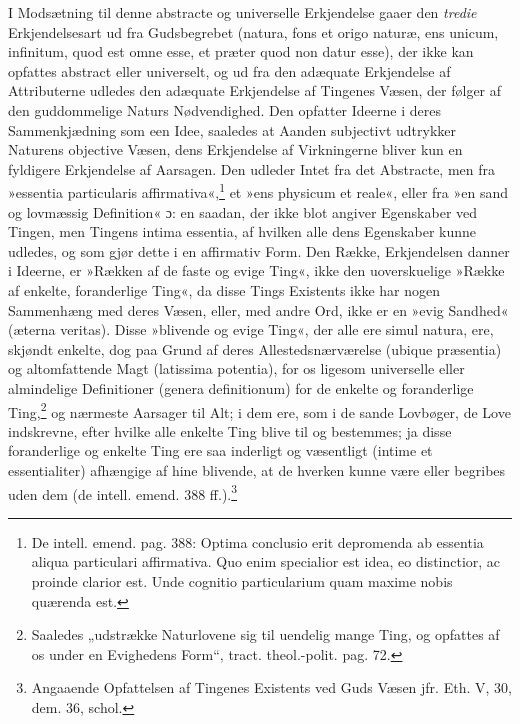 \documentclass[12pt,a4paper]{book}
\newcommand{\opage}[1]{\marginnote{\footnotesize\textit{[#1]}}}
\begin{document}
I Modsætning til denne abstracte og universelle Erkjendelse gaaer
den \emph{tredie} Erkjendelsesart ud fra Gudsbegrebet (natura, fons
et origo naturæ, ens unicum, infinitum, quod est omne esse, et
præter quod non datur esse), der ikke kan opfattes abstract eller
universelt, og ud fra den adæquate
\opage{102} \setcounter{footnote}{0}%
Erkjendelse af Attributerne udledes den adæquate Erkjendelse af
Tingenes Væsen, der følger af den guddommelige Naturs Nødvendighed.
Den opfatter Ideerne i deres Sammenkjædning som een Idee, saaledes
at Aanden subjectivt udtrykker Naturens objective Væsen, dens
Erkjendelse af Virkningerne bliver kun en fyldigere Erkjendelse af
Aarsagen. Den udleder Intet fra det Abstracte, men fra »essentia
particularis affirmativa«,\footnote{De intell. emend. pag. 388:
Optima conclusio erit depromenda ab essentia aliqua particulari
affirmativa. Quo enim specialior est idea, eo distinctior, ac
proinde clarior est. Unde cognitio particularium quam maxime nobis
quærenda est.} et »ens physicum et reale«, eller fra »en sand og
lovmæssig Definition« ɔ: en saadan, der ikke blot angiver Egenskaber
ved Tingen, men Tingens intima essentia, af hvilken alle dens
Egenskaber kunne udledes, og som gjør dette i en affirmativ Form.
Den Række, Erkjendelsen danner i Ideerne, er »Rækken af de faste og
evige Ting«, ikke den uoverskuelige »Række af enkelte, foranderlige
Ting«, da disse Tings Existents ikke har nogen Sammenhæng med deres
Væsen, eller, med andre Ord, ikke er en »evig Sandhed« (æterna
veritas). Disse »blivende og evige Ting«, der alle ere simul natura,
ere, skjøndt enkelte, dog paa Grund af deres Allestedsnærværelse
(ubique præsentia) og altomfattende Magt (latissima potentia), for
os ligesom universelle eller almindelige Definitioner (genera
definitionum) for de enkelte og foranderlige
Ting,\footnote{Saaledes „udstrække Naturlovene sig til uendelig
mange Ting, og opfattes af os under en Evighedens Form“, tract.
theol.-polit. pag. 72.} og nærmeste Aarsager til Alt; i dem ere, som
i de sande Lovbøger, de Love indskrevne, efter hvilke alle enkelte
Ting blive til og bestemmes; ja disse foranderlige og enkelte Ting
ere saa inderligt og væsentligt (intime et essentialiter) afhængige
af hine blivende, at de hverken kunne være eller begribes uden dem
(de intell. emend. 388 ff.).\footnote{Angaaende Opfattelsen af
Tingenes Existents ved Guds Væsen jfr. Eth. V, 30, dem. 36, schol.}
\end{document}
